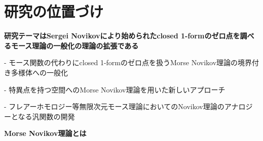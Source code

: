 \documentclass[11pt,a4j,dvipdfmx]{jarticle} 					%
\newcommand{\研究課題名}{象の卵}
\newcommand{\研究機関名}{京都大学}
\newcommand{\研究代表者氏名}{福士謙二}
\begin{document}

\section{研究の位置づけ}

\noindent\Large
\textbf{研究テーマはSergei Novikovにより始められたclosed 1-formのゼロ点を調べるモース理論の一般化の理論の拡張である}

\normalsize
\vspace{2mm}
			- モース関数の代わりにclosed 1-formのゼロ点を扱うMorse Novikov理論の境界付き多様体への一般化


		- 特異点を持つ空間へのMorse Novikov理論を用いた新しいアプローチ


			- フレアーホモロジー等無限次元モース理論においてのNovikov理論のアナロジーとなる汎関数の開発


\vspace{4mm}
\noindent\Large
 \textbf{Morse Novikov理論とは}\normalsize
\vspace{2mm}
\end{document}
